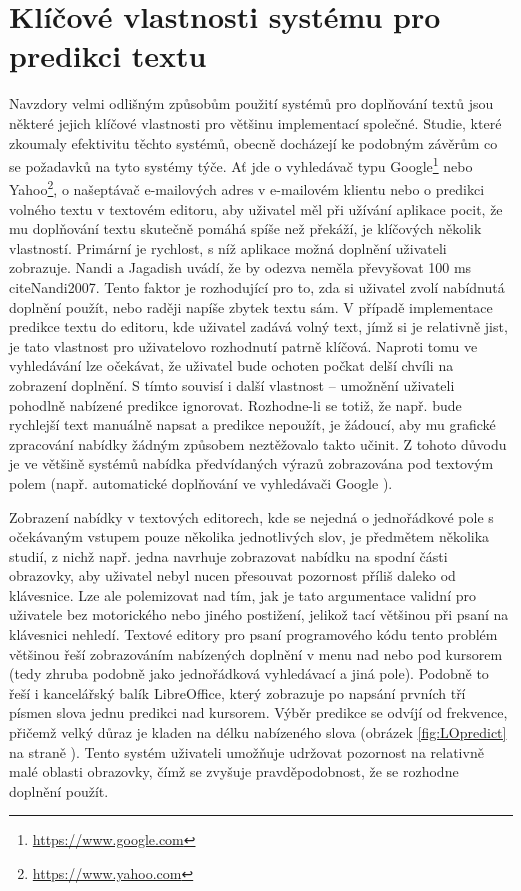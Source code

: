 \documentclass[a4paper,11pt]{article}
\newcommand{\td}[2][]{
	{\todo[size=\footnotesize]{#2}}
}
\begin{document}
\section{Klíčové vlastnosti systému pro predikci textu}

Navzdory velmi odlišným způsobům použití systémů pro doplňování textů jsou některé jejich klíčové vlastnosti pro většinu implementací společné. Studie, které zkoumaly efektivitu těchto systémů, obecně docházejí ke podobným závěrům co se požadavků na tyto systémy týče. Ať jde o vyhledávač typu Google\footnote{\url{https://www.google.com}} nebo Yahoo\footnote{\url{https://www.yahoo.com}}, o našeptávač e-mailových adres v e-mailovém klientu nebo o predikci volného textu v textovém editoru, aby uživatel měl při užívání aplikace pocit, že mu doplňování textu skutečně pomáhá spíše než překáží, je klíčových několik vlastností.  Primární je rychlost, s níž aplikace možná doplnění uživateli zobrazuje. Nandi a Jagadish uvádí, že by odezva neměla převyšovat 100 ms \\cite{Nandi2007}. Tento faktor je rozhodující pro to, zda si uživatel zvolí nabídnutá doplnění použít, nebo raději napíše zbytek textu sám. V případě implementace predikce textu do editoru, kde uživatel zadává volný text, jímž si je relativně jist, je tato vlastnost pro uživatelovo rozhodnutí patrně klíčová. Naproti tomu ve vyhledávání lze očekávat, že uživatel bude ochoten počkat delší chvíli na zobrazení doplnění. S tímto souvisí i další vlastnost -- umožnění uživateli pohodlně nabízené predikce ignorovat. \parencite{ward2012autocomplete} Rozhodne-li se totiž, že např. bude rychlejší text manuálně napsat a predikce nepoužít, je žádoucí, aby mu grafické zpracování nabídky žádným způsobem neztěžovalo takto učinit. Z tohoto důvodu je ve většině systémů nabídka předvídaných výrazů zobrazována pod textovým polem (např. automatické doplňování ve vyhledávači Google \parencite{google2015}). 

Zobrazení nabídky v textových editorech, kde se nejedná o jednořádkové pole s očekávaným vstupem pouze několika jednotlivých slov, je předmětem několika studií, z nichž např. jedna navrhuje zobrazovat nabídku na spodní části obrazovky, aby uživatel nebyl nucen přesouvat \td{ocitovat}pozornost příliš daleko od klávesnice. %
Lze ale polemizovat nad tím, jak je tato argumentace validní pro uživatele bez motorického nebo jiného postižení, jelikož tací většinou při psaní na klávesnici nehledí. Textové editory pro psaní programového kódu tento problém většinou řeší zobrazováním nabízených doplnění v menu nad nebo pod kursorem (tedy zhruba podobně jako jednořádková vyhledávací a jiná pole). Podobně to řeší i kancelářský balík LibreOffice, který zobrazuje po napsání prvních tří písmen slova jednu predikci nad kursorem. Výběr predikce se odvíjí od frekvence, přičemž velký důraz je kladen na délku nabízeného slova (obrázek \ref{fig:LOpredict} na straně \pageref{fig:LOpredict}). Tento systém uživateli umožňuje udržovat pozornost na relativně malé oblasti obrazovky, čímž se zvyšuje pravděpodobnost, že se rozhodne doplnění použít. 
\end{document}
